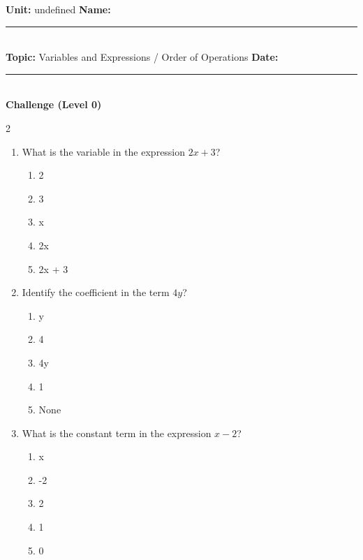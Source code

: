 \documentclass[10pt]{article}
\begin{document}
\enlargethispage{2.5cm}

\begin{tcolorbox}[colback=mainblue!5, colframe=mainblue, sharp corners, boxrule=0.5pt]
    \small \textbf{Unit:} undefined \hfill \textbf{Name:} \rule{3cm}{0.4pt} \\
    \small \textbf{Topic:} Variables and Expressions / Order of Operations \hfill \textbf{Date:} \rule{2cm}{0.4pt} \\
    \centering \textbf{\large Challenge (Level 0)}
\end{tcolorbox}

\vspace{0.2cm}

\begin{multicols}{2}
\begin{enumerate}[label=\textbf{Q\arabic*.}, leftmargin=*, itemsep=6pt, parsep=0pt]

  \item \small What is the variable in the expression $2x + 3$?
  \begin{enumerate}[label=(\Alph*), leftmargin=0.6cm, nosep, itemsep=2pt]
    \item 2
    \item 3
    \item x
    \item 2x
    \item 2x + 3
  \end{enumerate}

  \item \small Identify the coefficient in the term $4y$?
  \begin{enumerate}[label=(\Alph*), leftmargin=0.6cm, nosep, itemsep=2pt]
    \item y
    \item 4
    \item 4y
    \item 1
    \item None
  \end{enumerate}

  \item \small What is the constant term in the expression $x - 2$?
  \begin{enumerate}[label=(\Alph*), leftmargin=0.6cm, nosep, itemsep=2pt]
    \item x
    \item -2
    \item 2
    \item 1
    \item 0
  \end{enumerate}


\end{enumerate}
\end{multicols}
\end{document}

